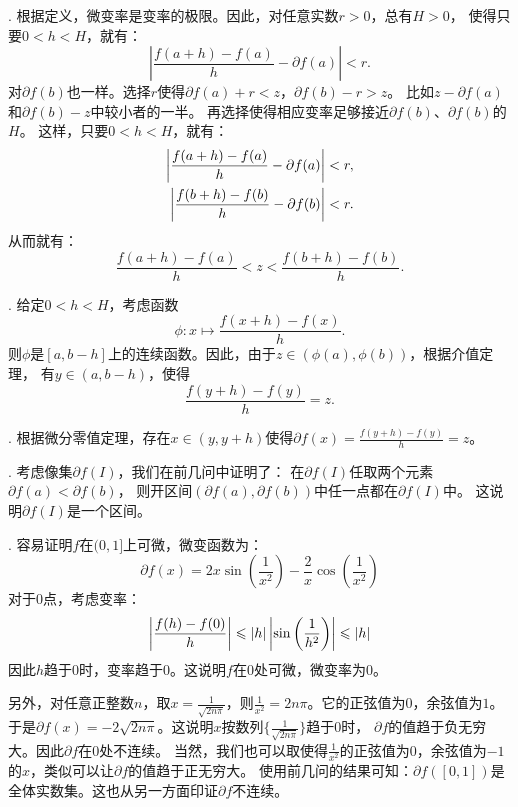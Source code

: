 \documentclass[12pt,UTF8]{ctexbook}
\begin{document}
\begin{so}
    . 根据定义，微变率是变率的极限。因此，对任意实数$r>0$，总有$H>0$，
    使得只要$0 < h < H$，就有：
    $$\left| \frac{f(a + h) - f(a)}{h} - \partial f(a) \right| < r.$$
    对$\partial f (b)$也一样。选择$r$使得$\partial f(a) + r < z$，$\partial f(b) - r > z$。
    比如$z - \partial f(a)$和$\partial f(b) - z$中较小者的一半。
    再选择使得相应变率足够接近$\partial f (b)$、$\partial f (b)$的$H$。
    这样，只要$0 < h < H$，就有：
    \begin{align}
        \left| \frac{f(a + h) - f(a)}{h} - \partial f(a) \right| < r, \notag \\
        \left| \frac{f(b + h) - f(b)}{h} - \partial f(b) \right| < r. \notag
    \end{align}
    从而就有：
    $$ \frac{f(a + h) - f(a)}{h} < z < \frac{f(b + h) - f(b)}{h}. $$
    
    . 给定$0 < h < H$，考虑函数
    $$\phi : x\mapsto \frac{f(x + h) - f(x)}{h}. $$
    则$\phi$是$[a, b-h]$上的连续函数。因此，由于$z\in (\phi(a), \phi(b))$，根据介值定理，
    有$y\in (a, b-h)$，使得
    $$ \frac{f(y + h) - f(y)}{h} = z.$$

    . 根据微分零值定理，存在$x\in (y, y+h)$使得$\partial f(x) = \frac{f(y + h) - f(y)}{h} = z$。

    . 考虑像集$\partial f(I)$，我们在前几问中证明了：
    在$\partial f(I)$任取两个元素$\partial f(a) < \partial f(b)$，
    则开区间$(\partial f(a), \partial f(b))$中任一点都在$\partial f(I)$中。
    这说明$\partial f(I)$是一个区间。

    . 容易证明$f$在$(0, 1]$上可微，微变函数为：
    $$ \partial f(x) = 2x\sin{\left(\frac{1}{x^2}\right)} - \frac{2}{x} \cos{\left(\frac{1}{x^2}\right)}$$
    对于$0$点，考虑变率：
    \begin{align}
        \left| \frac{f(h) - f(0)}{h} \right| \leqslant |h|\left|\sin{\left(\frac{1}{h^2}\right)}\right| \leqslant |h| \notag
    \end{align}
    因此$h$趋于$0$时，变率趋于$0$。这说明$f$在$0$处可微，微变率为$0$。

    另外，对任意正整数$n$，取$x = \frac{1}{\sqrt{2n \pi}}$，则$\frac{1}{x^2} = 2n \pi$。它的正弦值为$0$，余弦值为$1$。
    于是$\partial f(x) = -2\sqrt{2n\pi}$。这说明$x$按数列$\{\frac{1}{\sqrt{2n \pi}}\}$趋于$0$时，
    $\partial f$的值趋于负无穷大。因此$\partial f$在$0$处不连续。
    当然，我们也可以取使得$\frac{1}{x^2}$的正弦值为$0$，余弦值为$-1$的$x$，类似可以让$\partial f$的值趋于正无穷大。
    使用前几问的结果可知：$\partial f([0,1])$是全体实数集。这也从另一方面印证$\partial f$不连续。
\end{so}
\end{document}
